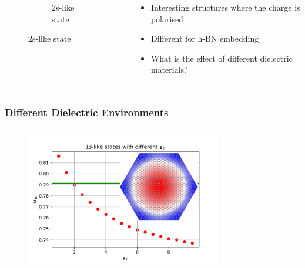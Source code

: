 \documentclass{beamer}
\begin{document}
\begin{frame}
\begin{columns}
\begin{figure}[H]
\begin{subfigure}[b]{0.45\textwidth}
        \caption{2s-like state}
        \vspace{-1ex}
      \end{subfigure}
    \end{figure}
\begin{itemize}
    \item Interesting structures where the charge is polarised
    \item Different for h-BN embedding
    \item What is the effect of different dielectric materials?
\end{itemize}
\end{columns}
\end{frame}

\begin{frame}
\frametitle{Different Dielectric Environments}
\begin{columns}
    \begin{figure}[H]
        \centering
        \includegraphics[width=\textwidth]{img/1s.pdf} 
    \end{figure}
\begin{figure}
        \centering

\end{figure}
\end{columns}
\end{frame}
\end{document}
